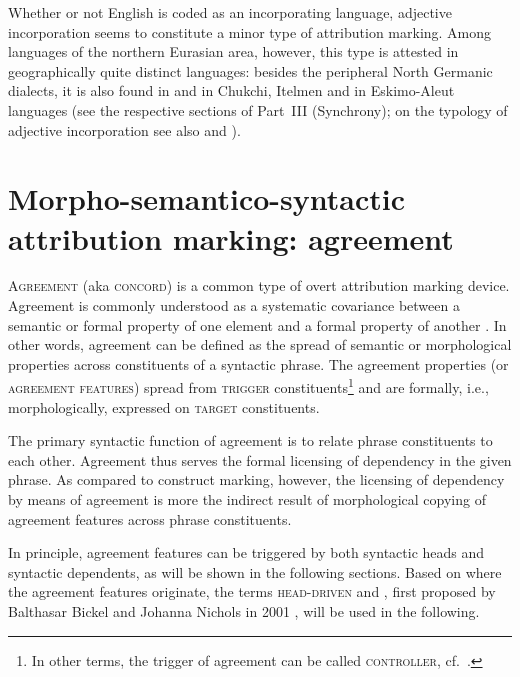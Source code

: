Whether or not English is coded as an incorporating language, adjective incorporation seems to constitute a minor type of attribution marking. Among languages of the northern Eurasian area, however, this type is attested in geographically quite distinct languages: besides the peripheral North Germanic dialects, it is also found in  and in Chukchi, Itelmen and in Eskimo-Aleut languages (see the respective sections of Part~III (Synchrony); on the typology of adjective incorporation see also \citet[225–236]{dahl2004a} and \citet[28–29]{dahl2015a}).

\section[Agreement marking]{Morpho-semantico-syntactic attribution marking: agreement}

\textsc{Agreement} (aka \textsc{concord}) is a common type of overt attribution marking device. Agreement is commonly understood as a systematic covariance between a semantic or formal property of one element and a formal property of another \citep[610]{steele1978}. In other words, agreement can be defined as the spread of semantic or morphological properties across constituents of a syntactic phrase. The agreement properties (or \textsc{agreement features}) spread from \textsc{trigger} constituents\footnote{In other terms, the trigger of agreement can be called \textsc{controller}, cf.~\citealt{corbett2006}.} and are formally, i.e., morphologically, expressed on \textsc{target} constituents.

The primary syntactic function of agreement is to relate phrase constituents to each other. Agreement thus serves the formal licensing of dependency in the given phrase. As compared to construct marking, however, the licensing of dependency by means of agreement is more the indirect result of morphological copying of agreement features across phrase constituents.

In principle, agreement features can be triggered by both syntactic heads and syntactic dependents, as will be shown in the following sections. Based on where the agreement features originate, the terms \textsc{head\hyp{}driven} and \textsc{}, first proposed by Balthasar Bickel and Johanna Nichols in 2001 \citep[published as][]{bickel-etal2007}, will be used in the following.

